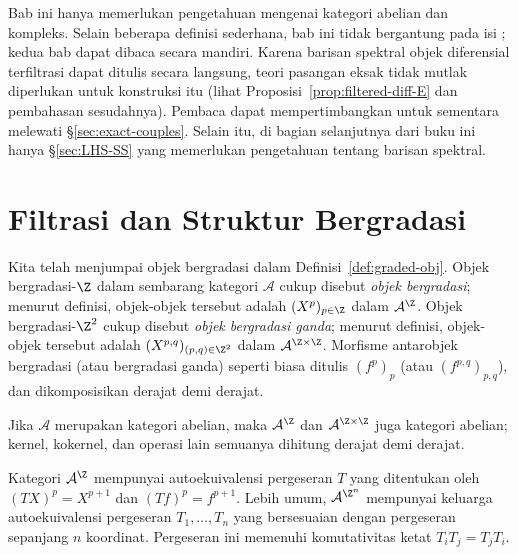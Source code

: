 \begin{wenxintishi}
	Bab ini hanya memerlukan pengetahuan mengenai kategori abelian dan kompleks.
Selain beberapa definisi sederhana, bab ini tidak bergantung pada isi
; kedua bab dapat dibaca secara mandiri.
Karena barisan spektral objek diferensial terfiltrasi dapat ditulis secara
langsung, teori pasangan eksak tidak mutlak diperlukan untuk konstruksi itu
(lihat Proposisi~\ref{prop:filtered-diff-E} dan pembahasan sesudahnya). Pembaca
dapat mempertimbangkan untuk sementara melewati \S\ref{sec:exact-couples}.
Selain itu, di bagian selanjutnya dari buku ini hanya \S\ref{sec:LHS-SS} yang
memerlukan pengetahuan tentang barisan spektral.
\end{wenxintishi}

\section{Filtrasi dan Struktur Bergradasi}\label{sec:grading-filtration}

Kita telah menjumpai objek bergradasi dalam Definisi~\ref{def:graded-obj}.
Objek bergradasi-$\Z$ dalam sembarang kategori $\mathcal{A}$ cukup disebut
\emph{objek bergradasi}; menurut definisi, objek-objek tersebut adalah
$(X^p)_{p\in\Z}$ dalam $\mathcal{A}^{\Z}$. Objek bergradasi-$\Z^2$ cukup
disebut \emph{objek bergradasi ganda}; menurut definisi, objek-objek tersebut
adalah $(X^{p,q})_{(p,q)\in\Z^2}$ dalam
$\mathcal{A}^{\Z\times\Z}$. Morfisme antarobjek bergradasi (atau bergradasi
ganda) seperti biasa ditulis $(f^p)_p$ (atau $(f^{p,q})_{p,q}$), dan
dikomposisikan derajat demi derajat. 

Jika $\mathcal{A}$ merupakan kategori abelian, maka
$\mathcal{A}^{\Z}$ dan $\mathcal{A}^{\Z\times\Z}$ juga kategori abelian;
kernel, kokernel, dan operasi lain semuanya dihitung derajat demi derajat.

Kategori $\mathcal{A}^{\Z}$ mempunyai autoekuivalensi pergeseran $T$ yang
ditentukan oleh $(TX)^p=X^{p+1}$ dan $(Tf)^p=f^{p+1}$. Lebih umum,
$\mathcal{A}^{\Z^n}$ mempunyai keluarga autoekuivalensi pergeseran
$T_1,\ldots,T_n$ yang bersesuaian dengan pergeseran sepanjang $n$ koordinat.
Pergeseran ini memenuhi komutativitas ketat $T_iT_j=T_jT_i$.


